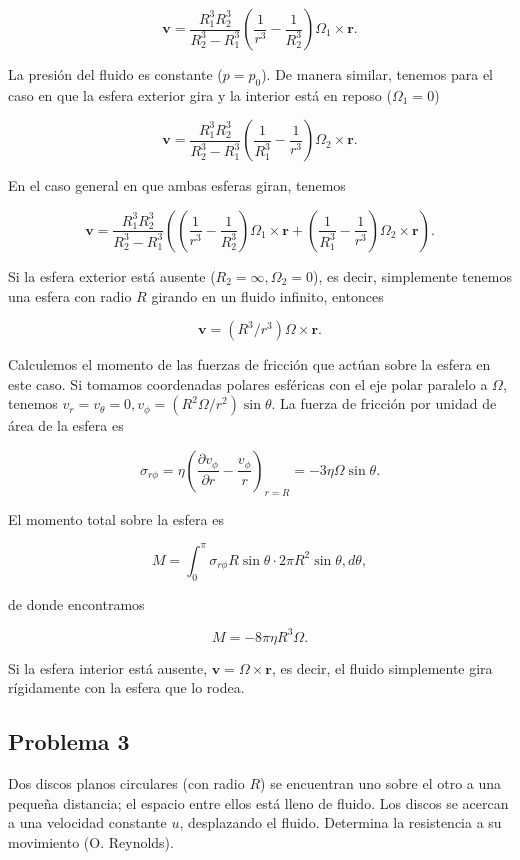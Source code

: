 \documentclass{article}
\begin{document}
$$
\mathbf{v} = \frac{R_1^3 R_2^3}{R_2^3 - R_1^3} \left( \frac{1}{r^3} - \frac{1}{R_2^3} \right) \Omega_1 \times \mathbf{r}.
$$

La presión del fluido es constante ($p = p_0$). De manera similar, tenemos para el caso en que la esfera exterior gira y la interior está en reposo ($\Omega_1 = 0$)

$$
\mathbf{v} = \frac{R_1^3 R_2^3}{R_2^3 - R_1^3} \left( \frac{1}{R_1^3} - \frac{1}{r^3} \right) \Omega_2 \times \mathbf{r}.
$$

En el caso general en que ambas esferas giran, tenemos

$$
\mathbf{v} = \frac{R_1^3 R_2^3}{R_2^3 - R_1^3} \left( \left( \frac{1}{r^3} - \frac{1}{R_2^3} \right) \Omega_1 \times \mathbf{r} + \left( \frac{1}{R_1^3} - \frac{1}{r^3} \right) \Omega_2 \times \mathbf{r} \right).
$$

Si la esfera exterior está ausente ($R_2 = \infty, \Omega_2 = 0$), es decir, simplemente tenemos una esfera con radio $R$ girando en un fluido infinito, entonces

$$
\mathbf{v} = (R^3/r^3) \Omega \times \mathbf{r}.
$$

Calculemos el momento de las fuerzas de fricción que actúan sobre la esfera en este caso. Si tomamos coordenadas polares esféricas con el eje polar paralelo a $\Omega$, tenemos $v_r = v_\theta = 0, v_\phi = (R^2 \Omega/r^2) \sin \theta$. La fuerza de fricción por unidad de área de la esfera es

$$
\sigma_{r\phi} = \eta \left( \frac{\partial v_\phi}{\partial r} - \frac{v_\phi}{r} \right)_{r=R} = -3\eta \Omega \sin \theta.
$$

El momento total sobre la esfera es

$$
M = \int_0^\pi \sigma_{r\phi} R \sin \theta \cdot 2\pi R^2 \sin \theta , d\theta,
$$

de donde encontramos

$$
M = -8\pi \eta R^3 \Omega.
$$

Si la esfera interior está ausente, $\mathbf{v} = \Omega \times \mathbf{r}$, es decir, el fluido simplemente gira rígidamente con la esfera que lo rodea.

\subsection*{Problema 3}

Dos discos planos circulares (con radio $R$) se encuentran uno sobre el otro a una pequeña distancia; el espacio entre ellos está lleno de fluido. Los discos se acercan a una velocidad constante $u$, desplazando el fluido. Determina la resistencia a su movimiento (O. Reynolds).
\end{document}
